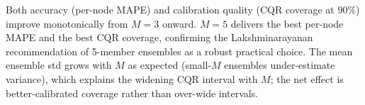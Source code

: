 \documentclass{article}
\begin{document}
\begin{table}[h]
  \centering
  \caption{Ensemble-size ablation on the ID test set at nominal $90\%$
    coverage. $\hat{Q}$ and width are reported in MPa.}
  \label{tab:ensemble-ablation}
\end{table}

Both accuracy (per-node MAPE) and calibration quality (CQR coverage at
$90\%$) improve monotonically from $M=3$ onward. $M=5$ delivers the
best per-node MAPE and the best CQR coverage, confirming the
Lakshminarayanan~\citep{lakshminarayanan2017ensembles} recommendation
of 5-member ensembles as a robust practical choice. The mean ensemble
std grows with $M$ as expected (small-$M$ ensembles under-estimate
variance), which explains the widening CQR interval with $M$; the net
effect is better-calibrated coverage rather than over-wide intervals.
\end{document}
